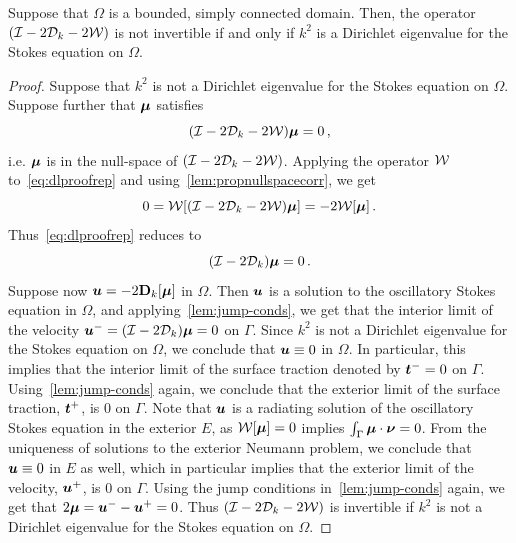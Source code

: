 \begin{thrm}
\label{thm:dlmain}
Suppose that $\Omega$ is a bounded, simply connected domain. Then, the operator
$(\mathcal I - 2{\mathcal D}_{k} - 2 {\mathcal W})$ is not invertible if and only if $k^2$ is a
Dirichlet eigenvalue for the Stokes equation on $\Omega$.
\end{thrm}
\begin{proof}
  Suppose that $k^2$ is not a Dirichlet eigenvalue for
  the Stokes equation on
$\Omega$. 
Suppose further that ${\boldsymbol \mu}$ satisfies
\begin{equation}
(\mathcal I - 2{\mathcal D}_{k} - 2{\mathcal W}) {\boldsymbol \mu} = 0 \, , \label{eq:dlproofrep}
\end{equation}
i.e. ${\boldsymbol \mu}$ is in the null-space
of $(\mathcal I - 2 {\mathcal D}_{k} - 2 {\mathcal W})$. 
Applying the operator ${\mathcal W}$ to~\cref{eq:dlproofrep} and 
using~\cref{lem:propnullspacecorr}, we get
\begin{equation}
0 = {\mathcal W} [(\mathcal I - 2{\mathcal D}_{k} - 2{\mathcal W}){\boldsymbol \mu}] = -2{\mathcal W} [{\boldsymbol \mu}] \, .
\end{equation}
Thus~\cref{eq:dlproofrep} reduces to
\begin{equation}
(\mathcal I - 2 {\mathcal D}_{k}){\boldsymbol \mu} = 0\, .
\end{equation}
Suppose now ${\boldsymbol u} = -2{\bf D}_{k}[{\boldsymbol \mu}]$ in $\Omega$.
Then ${\boldsymbol u}$ is a solution to the oscillatory Stokes equation in $\Omega$,
and applying~\cref{lem:jump-conds}, we get that the interior
limit of the velocity ${\boldsymbol u}^{-}=(\mathcal I - 2{\mathcal D}_{k}) {\boldsymbol \mu} = 0$
on $\Gamma$. Since $k^2$ is not a Dirichlet eigenvalue for the Stokes
equation on $\Omega$, we conclude that ${\boldsymbol u} \equiv 0$ in $\Omega$. 
In particular, this implies that the interior limit of the surface traction
denoted by ${\boldsymbol t}^{-} = 0$ on $\Gamma$. 
Using~\cref{lem:jump-conds} again, we conclude that the exterior limit
of the surface traction, ${\boldsymbol t}^{+}$, is $0$ on $\Gamma$. 
Note that ${\boldsymbol u}$ is a radiating solution of the oscillatory
Stokes equation in the exterior $E$, as ${\mathcal W}[{\boldsymbol \mu}] = 0$ implies
$\int_{\Gamma} {\boldsymbol \mu} \cdot {\boldsymbol \nu} = 0$.
From the uniqueness of solutions to the exterior Neumann problem, 
we conclude that ${\boldsymbol u} \equiv 0$ in $E$ as well,
which in particular implies that
the exterior limit of the velocity, ${\boldsymbol u}^{+}$, is $0$ on $\Gamma$.   
Using the jump conditions in~\cref{lem:jump-conds} again, we
get that $2{\boldsymbol \mu} = {\boldsymbol u}^{-} - {\boldsymbol u}^{+} = 0$.
Thus $(\mathcal I - 2{\mathcal D}_{k} - 2{\mathcal W})$ is invertible if $k^2$
is not a Dirichlet eigenvalue for the Stokes equation on $\Omega$.


\end{proof}
